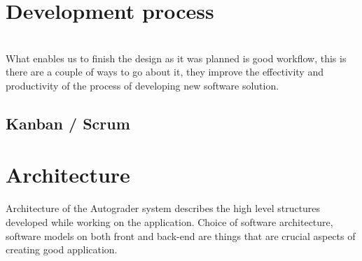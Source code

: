 \section{Development process}
\\
What enables us to finish the design as it was planned is good workflow, this is there are a couple of ways to go about it, they improve the effectivity and productivity of the process of developing new software solution.
\subsection{Kanban / Scrum}

\section{Architecture}
Architecture of the Autograder system describes the high level structures developed while working on the application. Choice of software architecture, software models on both front and back-end are things that are crucial aspects of creating good application.

